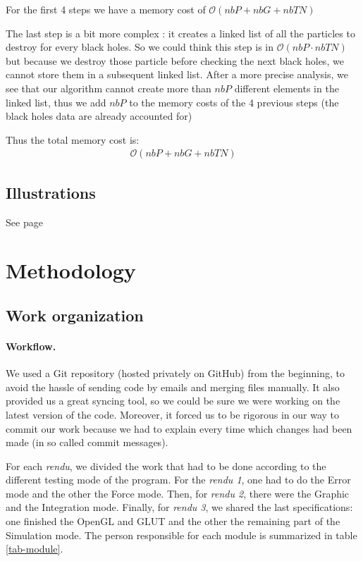 \documentclass[a4paper]{article} %
\begin{document}
\begin{multicols*}{2}
For the first 4 steps we have a memory cost of $\mathcal{O}(nbP + nbG + nbTN)$

The last step is a bit more complex :
it creates a linked list of all the particles to destroy for every black holes.
So we could think this step is in $\mathcal{O}(nbP \cdot nbTN)$ but because we destroy those particle before
checking the next black holes, we cannot store them in a subsequent linked list.
After a more precise analysis, we see that our algorithm cannot create more than $nbP$ different
elements in the linked list, thus we add $nbP$ to the memory costs of the 4 previous steps
(the black holes data are already accounted for)

Thus the total memory cost is:
\begin{align}
\mathcal{O}(nbP + nbG + nbTN)
\end{align}


\subsection{Illustrations}
See page \pageref{lastpage}

\section{Methodology}
\subsection{Work organization}

\paragraph{Workflow.} We used a Git repository (hosted privately on GitHub) from the beginning,
to avoid the hassle of sending code by emails and merging files manually.
It also provided us a great syncing tool, so we could be sure we were working on
the latest version of the code.
Moreover, it forced us to be rigorous in our way to commit our work
because we had to explain every time which changes had been made
(in so called commit messages).

For each \emph{rendu}, we divided the work that had to be done
according to the different testing mode of the program.
For the \emph{rendu 1}, one had to do the Error mode and the other the Force mode.
Then, for \emph{rendu 2}, there were the Graphic and the Integration mode.
Finally, for \emph{rendu 3}, we shared the last specifications:
one finished the OpenGL and GLUT
and the other the remaining part of the Simulation mode.
The person responsible for each module is summarized in table \ref{tab-module}.


\end{multicols*}
\end{document}
